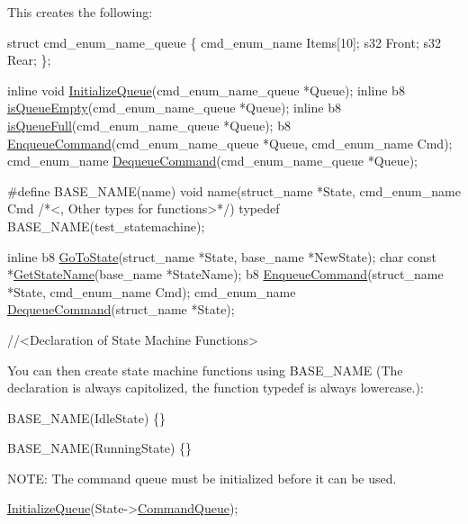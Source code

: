 This creates the following\+: 
\begin{DoxyCode}
\textcolor{keyword}{struct }cmd\_enum\_name\_queue
\{
    cmd\_enum\_name Items[10];
    s32 Front;
    s32 Rear;
\};

\textcolor{keyword}{inline} \textcolor{keywordtype}{void} \hyperlink{Generated__Test_8h_a43822849924e4365ec1ad146736a7967}{InitializeQueue}(cmd\_enum\_name\_queue *Queue);
\textcolor{keyword}{inline} b8 \hyperlink{Generated__Test_8h_a24b3c990497a61d0d6aca57105e2c86a}{isQueueEmpty}(cmd\_enum\_name\_queue *Queue);
\textcolor{keyword}{inline} b8 \hyperlink{Generated__Test_8h_a5074b01af8cb1f2124b7d04399a48c82}{isQueueFull}(cmd\_enum\_name\_queue *Queue);
b8 \hyperlink{Generated__Test_8h_a9ca011b44b1d493d71b8414f84af2f69}{EnqueueCommand}(cmd\_enum\_name\_queue *Queue, cmd\_enum\_name Cmd);
cmd\_enum\_name \hyperlink{Generated__Test_8h_aa15eaba01fecffd4380ff2f1b4018a3a}{DequeueCommand}(cmd\_enum\_name\_queue *Queue);

\textcolor{preprocessor}{#define BASE\_NAME(name) void name(struct\_name *State, cmd\_enum\_name Cmd }\textcolor{comment}{/*<, Other types for functions>*/}\textcolor{preprocessor}{)}
\textcolor{keyword}{typedef} BASE\_NAME(test\_statemachine);

\textcolor{keyword}{inline} b8 \hyperlink{Generated__Test_8h_ad4b73e92f4af2b501841ce35b274f71c}{GoToState}(struct\_name *State, base\_name  *NewState);
\textcolor{keywordtype}{char} \textcolor{keyword}{const} *\hyperlink{Generated__Test_8h_a36c15d4c27a71b37003bfc22b75964be}{GetStateName}(base\_name *StateName);
b8 \hyperlink{Generated__Test_8h_a9ca011b44b1d493d71b8414f84af2f69}{EnqueueCommand}(struct\_name *State, cmd\_enum\_name Cmd);
cmd\_enum\_name \hyperlink{Generated__Test_8h_aa15eaba01fecffd4380ff2f1b4018a3a}{DequeueCommand}(struct\_name *State);

\textcolor{comment}{//<Declaration of State Machine Functions>}
\end{DoxyCode}


You can then create state machine functions using {\ttfamily B\+A\+S\+E\+\_\+\+N\+A\+ME} (The declaration is always capitolized, the function typedef is always lowercase.)\+: 
\begin{DoxyCode}
BASE\_NAME(IdleState)
\{\}

BASE\_NAME(RunningState)
\{\}
\end{DoxyCode}


N\+O\+TE\+: The command queue must be initialized before it can be used. 
\begin{DoxyCode}
\hyperlink{Generated__Test_8h_a43822849924e4365ec1ad146736a7967}{InitializeQueue}(State->\hyperlink{structtest__type_a9ef32b05c6f8a712062f8261d71665ca}{CommandQueue});
\end{DoxyCode}


